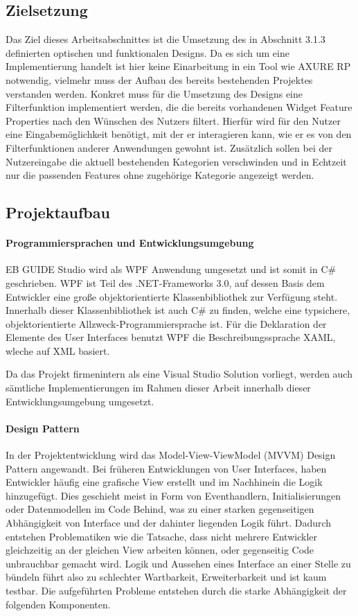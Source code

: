 \subsection {Zielsetzung}
Das Ziel dieses Arbeitsabschnittes ist die Umsetzung des in Abschnitt 3.1.3 definierten optischen und funktionalen Designs.
Da es sich um eine Implementierung handelt ist hier keine Einarbeitung in ein Tool wie AXURE RP notwendig, vielmehr muss der Aufbau des bereits bestehenden Projektes verstanden werden.
Konkret muss für die Umsetzung des Designs eine Filterfunktion implementiert werden, die die bereits vorhandenen Widget Feature Properties nach den Wünschen des Nutzers filtert.
Hierfür wird für den Nutzer eine Eingabemöglichkeit benötigt, mit der er interagieren kann, wie er es von den Filterfunktionen anderer Anwendungen gewohnt ist.
Zusätzlich sollen bei der Nutzereingabe die aktuell bestehenden Kategorien verschwinden und in Echtzeit nur die passenden Features ohne zugehörige Kategorie angezeigt werden.

\subsection {Projektaufbau}

\paragraph{Programmiersprachen und Entwicklungsumgebung}
EB GUIDE Studio wird als WPF Anwendung umgesetzt und ist somit in C\# geschrieben.
WPF ist Teil des .NET-Frameworks 3.0, auf dessen Basis dem Entwickler eine große objektorientierte Klassenbibliothek zur Verfügung steht.
Innerhalb dieser Klassenbibliothek ist auch C\# zu finden, welche eine typsichere, objektorientierte Allzweck-Programmiersprache ist.
Für die Deklaration der Elemente des User Interfaces benutzt WPF die Beschreibungssprache XAML, wleche auf XML basiert.

Da das Projekt firmenintern als eine Visual Studio Solution vorliegt, werden auch sämtliche Implementierungen im Rahmen dieser Arbeit innerhalb dieser Entwicklungsumgebung umgesetzt.

\paragraph{Design Pattern}
In der Projektentwicklung wird das Model-View-ViewModel (MVVM) Design Pattern angewandt.
Bei früheren Entwicklungen von User Interfaces, haben Entwickler häufig eine grafische View erstellt und im Nachhinein die Logik hinzugefügt.
Dies geschieht meist in Form von Eventhandlern, Initialisierungen oder Datenmodellen im Code Behind, was zu einer starken gegenseitigen Abhängigkeit von Interface und der dahinter liegenden Logik führt.
Dadurch entstehen Problematiken wie die Tatsache, dass nicht mehrere Entwickler gleichzeitig an der gleichen View arbeiten können, oder gegenseitig Code unbrauchbar gemacht wird.
Logik und Aussehen eines Interface an einer Stelle zu bündeln führt also zu schlechter Wartbarkeit, Erweiterbarkeit und ist kaum testbar\cite{.g}.
Die aufgeführten Probleme entstehen durch die starke Abhängigkeit der folgenden Komponenten.

